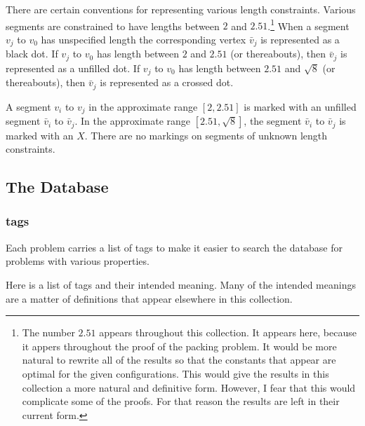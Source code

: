 There are certain conventions for representing various length constraints.
Various segments are constrained to have lengths between $2$ and $2.51$.\footnote{The number $2.51$ appears
throughout this collection.  It appears here, because it appers throughout
the proof of the packing problem.  It would be more natural to
rewrite all of the results so that the constants that appear are
optimal for the given configurations.  This would give
the results in this collection a more natural and definitive
form.  However, I fear that this would complicate some of
the proofs.  For that reason the results are left in their
current form.}  When a segment $v_j$ to $v_0$
has unspecified length the corresponding vertex $\bar v_j$ is represented
as a black dot.  If $v_j$ to $v_0$ has length between $2$ and $2.51$
(or thereabouts), then $\bar v_j$ is represented as a unfilled dot.
If $v_j$ to $v_0$ has length between $2.51$ and $\sqrt8$ (or
thereabouts), then $\bar v_j$ is represented as a crossed dot.

A segment $v_i$ to $v_j$ in the approximate range $[2,2.51]$ is marked with
an unfilled segment $\bar v_i$ to $\bar v_j$.  In the approximate
range $[2.51,\sqrt8]$, the segment $\bar v_i$ to $\bar v_j$ is marked
with an $X$.  There are no markings on segments of unknown length
constraints.





\subsection{The Database}

\subsubsection{tags}

Each problem carries a list of tags to make it easier to search the database for
problems with various properties.

Here is a list of tags and their intended meaning. Many of the intended meanings are a matter
of definitions that appear elsewhere in this collection.

\newenvironment{taglist}{}{}


